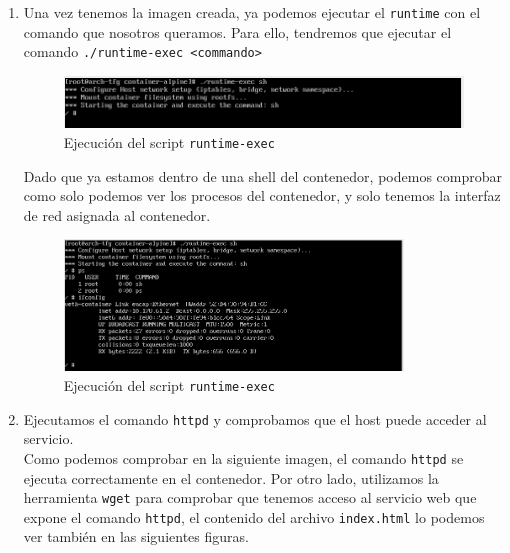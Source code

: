\documentclass[12pt]{article}
\begin{document}
\begin{enumerate}
		
		\item Una vez tenemos la imagen creada, ya podemos ejecutar el \texttt{runtime} con el comando que nosotros queramos. Para ello, tendremos que ejecutar el comando \texttt{./runtime-exec <commando>}
		
		\begin{figure}[h!]
			\begin{center}
				\includegraphics[width=1\textwidth]{img/container_runtime1.png}
				\caption{Ejecución del script \texttt{runtime-exec}}
			\end{center}
		\end{figure}
	
		\noindent Dado que ya estamos dentro de una shell del contenedor, podemos comprobar como solo podemos ver los procesos del contenedor, y solo tenemos la interfaz de red asignada al contenedor.
		
		\begin{figure}[h!]
			\begin{center}
				\includegraphics[width=0.85\textwidth]{img/container_runtime2.png}
				\caption{Ejecución del script \texttt{runtime-exec}}
			\end{center}
		\end{figure}
	
		\item Ejecutamos el comando \texttt{httpd} y comprobamos que el host puede acceder al servicio. \\
		
		\noindent Como podemos comprobar en la siguiente imagen, el comando \texttt{httpd} se ejecuta correctamente en el contenedor. Por otro lado, utilizamos la herramienta \texttt{wget} para comprobar que tenemos acceso al servicio web que expone el comando \texttt{httpd}, el contenido del archivo \texttt{index.html} lo podemos ver también en las siguientes figuras.
		

\end{enumerate}
\end{document}
